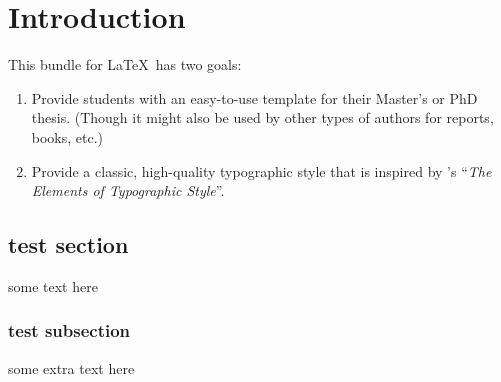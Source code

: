 \chapter{Introduction}\label{ch:introduction}
This bundle for \LaTeX\ has two goals:
\begin{enumerate}
    \item Provide students with an easy-to-use template for their
    Master's
    or PhD thesis. (Though it might also be used by other types of
    authors
    for reports, books, etc.)
    \item Provide a classic, high-quality typographic style that is
    inspired by \citeauthor{bringhurst:2002}'s ``\emph{The Elements of
    Typographic Style}''.
\end{enumerate}

\section*{test section}
some text here
\subsection*{test subsection}
some extra text here
